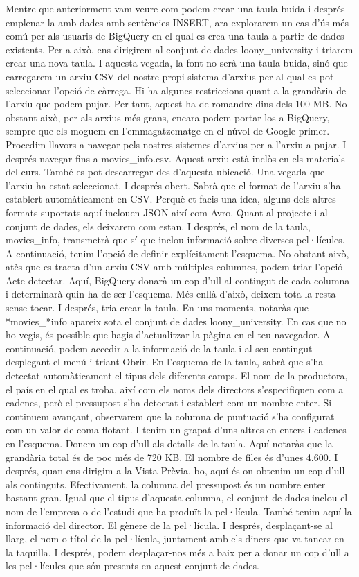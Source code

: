 \documentclass[12pt,longbibliography]{article}
\theoremstyle{definition}
\theoremstyle{remark}
\begin{document}
Mentre que anteriorment vam veure com podem crear una taula buida i després emplenar-la amb dades amb sentències INSERT, ara explorarem un cas d'ús més comú per als usuaris de BigQuery en el qual es crea una taula a partir de dades existents. Per a això, ens dirigirem al conjunt de dades loony_university i triarem crear una nova taula. I aquesta vegada, la font no serà una taula buida, sinó que carregarem un arxiu CSV del nostre propi sistema d'arxius per al qual es pot seleccionar l'opció de càrrega. Hi ha algunes restriccions quant a la grandària de l'arxiu que podem pujar. Per tant, aquest ha de romandre dins dels 100 MB. No obstant això, per als arxius més grans, encara podem portar-los a BigQuery, sempre que els moguem en l'emmagatzematge en el núvol de Google primer. Procedim llavors a navegar pels nostres sistemes d'arxius per a l'arxiu a pujar. I després navegar fins a movies_info.csv. Aquest arxiu està inclòs en els materials del curs. També es pot descarregar des d'aquesta ubicació. Una vegada que l'arxiu ha estat seleccionat. I després obert. Sabrà que el format de l'arxiu s'ha establert automàticament en CSV. Perquè et facis una idea, alguns dels altres formats suportats aquí inclouen JSON així com Avro. Quant al projecte i al conjunt de dades, els deixarem com estan. I després, el nom de la taula, movies_info, transmetrà que sí que inclou informació sobre diverses pel·lícules. A continuació, tenim l'opció de definir explícitament l'esquema. No obstant això, atès que es tracta d'un arxiu CSV amb múltiples columnes, podem triar l'opció Acte detectar. Aquí, BigQuery donarà un cop d'ull al contingut de cada columna i determinarà quin ha de ser l'esquema. Més enllà d'això, deixem tota la resta sense tocar. I després, tria crear la taula. En uns moments, notaràs que *movies_*info apareix sota el conjunt de dades loony_university. En cas que no ho vegis, és possible que hagis d'actualitzar la pàgina en el teu navegador. A continuació, podem accedir a la informació de la taula i al seu contingut desplegant el menú i triant Obrir. En l'esquema de la taula, sabrà que s'ha detectat automàticament el tipus dels diferents camps. El nom de la productora, el país en el qual es troba, així com els noms dels directors s'especifiquen com a cadenes, però el pressupost s'ha detectat i establert com un nombre enter. Si continuem avançant, observarem que la columna de puntuació s'ha configurat com un valor de coma flotant. I tenim un grapat d'uns altres en enters i cadenes en l'esquema. Donem un cop d'ull als detalls de la taula. Aquí notaràs que la grandària total és de poc més de 720 KB. El nombre de files és d'unes 4.600. I després, quan ens dirigim a la Vista Prèvia, bo, aquí és on obtenim un cop d'ull als continguts. Efectivament, la columna del pressupost és un nombre enter bastant gran. Igual que el tipus d'aquesta columna, el conjunt de dades inclou el nom de l'empresa o de l'estudi que ha produït la pel·lícula. També tenim aquí la informació del director. El gènere de la pel·lícula. I després, desplaçant-se al llarg, el nom o títol de la pel·lícula, juntament amb els diners que va tancar en la taquilla. I després, podem desplaçar-nos més a baix per a donar un cop d'ull a les pel·lícules que són presents en aquest conjunt de dades.
\end{document}
